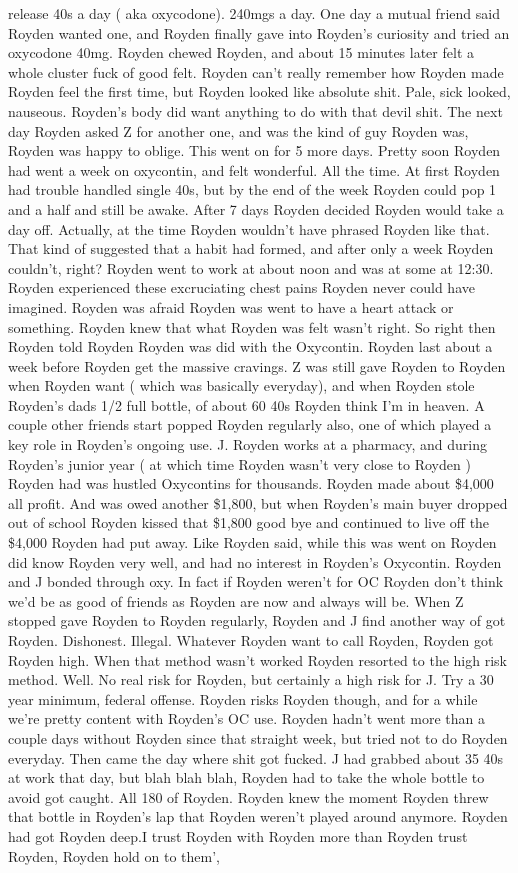 \documentclass[12pt]{book}
\begin{document}
release 40s a day ( aka oxycodone). 240mgs a day. One day a mutual friend said Royden wanted one, and Royden finally gave into Royden's curiosity and tried an oxycodone 40mg. Royden chewed Royden, and about 15 minutes later felt a whole cluster fuck of good felt. Royden can't really remember how Royden made Royden feel the first time, but Royden looked like absolute shit. Pale, sick looked, nauseous. Royden's body did want anything to do with that devil shit. The next day Royden asked Z for another one, and was the kind of guy Royden was, Royden was happy to oblige. This went on for 5 more days. Pretty soon Royden had went a week on oxycontin, and felt wonderful. All the time. At first Royden had trouble handled single 40s, but by the end of the week Royden could pop 1 and a half and still be awake. After 7 days Royden decided Royden would take a day off. Actually, at the time Royden wouldn't have phrased Royden like that. That kind of suggested that a habit had formed, and after only a week Royden couldn't, right? Royden went to work at about noon and was at some at 12:30. Royden experienced these excruciating chest pains Royden never could have imagined. Royden was afraid Royden was went to have a heart attack or something. Royden knew that what Royden was felt wasn't right. So right then Royden told Royden Royden was did with the Oxycontin. Royden last about a week before Royden get the massive cravings. Z was still gave Royden to Royden when Royden want ( which was basically everyday), and when Royden stole Royden's dads 1/2 full bottle, of about 60 40s Royden think I'm in heaven. A couple other friends start popped Royden regularly also, one of which played a key role in Royden's ongoing use. J. Royden works at a pharmacy, and during Royden's junior year ( at which time Royden wasn't very close to Royden ) Royden had was hustled Oxycontins for thousands. Royden made about \$4,000 all profit. And was owed another \$1,800, but when Royden's main buyer dropped out of school Royden kissed that \$1,800 good bye and continued to live off the \$4,000 Royden had put away. Like Royden said, while this was went on Royden did know Royden very well, and had no interest in Royden's Oxycontin. Royden and J bonded through oxy. In fact if Royden weren't for OC Royden don't think we'd be as good of friends as Royden are now and always will be. When Z stopped gave Royden to Royden regularly, Royden and J find another way of got Royden. Dishonest. Illegal. Whatever Royden want to call Royden, Royden got Royden high. When that method wasn't worked Royden resorted to the high risk method. Well. No real risk for Royden, but certainly a high risk for J. Try a 30 year minimum, federal offense. Royden risks Royden though, and for a while we're pretty content with Royden's OC use. Royden hadn't went more than a couple days without Royden since that straight week, but tried not to do Royden everyday. Then came the day where shit got fucked. J had grabbed about 35 40s at work that day, but blah blah blah, Royden had to take the whole bottle to avoid got caught. All 180 of Royden. Royden knew the moment Royden threw that bottle in Royden's lap that Royden weren't played around anymore. Royden had got Royden deep.I trust Royden with Royden more than Royden trust Royden, Royden hold on to them', 
\end{document}
